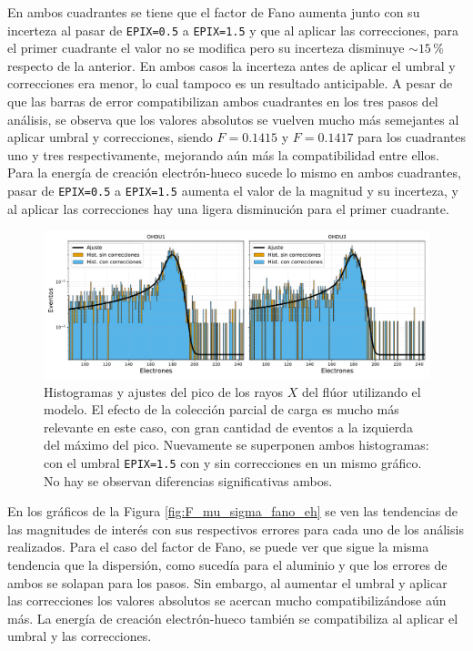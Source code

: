 En ambos cuadrantes se tiene que el factor de Fano aumenta junto con su incerteza al pasar de \verb|EPIX=0.5| a \verb|EPIX=1.5| y que al aplicar las correcciones, para el primer cuadrante el valor no se modifica pero su incerteza disminuye $\sim 15\,\%$ respecto de la anterior. En ambos casos la incerteza antes de aplicar el umbral y correcciones era menor, lo cual tampoco es un resultado anticipable. A pesar de que las barras de error compatibilizan ambos cuadrantes en los tres pasos del análisis, se observa que los valores absolutos se vuelven mucho más semejantes al aplicar umbral y correcciones, siendo $F=0.1415$ y $F=0.1417$ para los cuadrantes uno y tres respectivamente, mejorando aún más la compatibilidad entre ellos. Para la energía de creación electrón-hueco sucede lo mismo en ambos cuadrantes, pasar de \verb|EPIX=0.5| a \verb|EPIX=1.5| aumenta el valor de la magnitud y su incerteza, y al aplicar las correcciones hay una ligera disminución para el primer cuadrante. 
\begin{figure}[h]
    \centering
    \includegraphics[scale=0.5]{Figs/F_hists_ohdu1y3_dobles.pdf}
    \caption{Histogramas y ajustes del pico de los rayos $X$ del flúor utilizando el modelo. El efecto de la colección parcial de carga es mucho más relevante en este caso, con gran cantidad de eventos a la izquierda del máximo del pico. Nuevamente se superponen ambos histogramas: con el umbral \texttt{EPIX=1.5} con y sin correcciones en un mismo gráfico. No hay se observan diferencias significativas ambos.}
    \label{fig:F_OHDU1y3_EPIX15conCorr}
\end{figure}
En los gráficos de la Figura \ref{fig:F_mu_sigma_fano_eh} se ven las tendencias de las magnitudes de interés con sus respectivos errores para cada uno de los análisis realizados. Para el caso del factor de Fano, se puede ver que sigue la misma tendencia que la dispersión, como sucedía para el aluminio y que los errores de ambos se solapan para los pasos. Sin embargo, al aumentar el umbral y aplicar las correcciones los valores absolutos se acercan mucho compatibilizándose aún más. La energía de creación electrón-hueco también se compatibiliza al aplicar el umbral y las correcciones.
